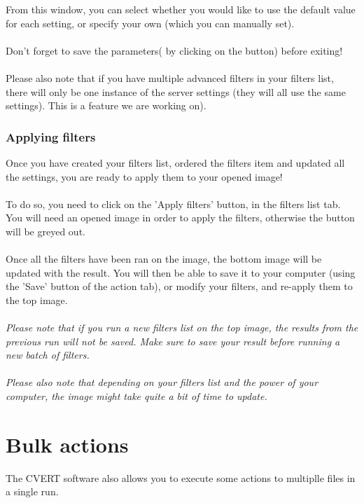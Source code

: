\documentclass[12pt,a4paper]{article}
\begin{document}
From this window, you can select whether you would like to use the default value for each setting, or specify your own (which you can manually set).\\
~\\
Don't forget to save the parameters( by clicking on the button) before exiting!\\
~\\
Please also note that if you have multiple advanced filters in your filters list, there will only be one instance of the server settings (they will all use the same settings). This is a feature we are working on).

\section{Applying filters}

Once you have created your filters list, ordered the filters item and updated all the settings, you are ready to apply them to your opened image!\\
~\\
To do so, you need to click on the 'Apply filters' button, in the filters list tab. You will need an opened image in order to apply the filters, otherwise the button will be greyed out.\\
~\\
Once all the filters have been ran on the image, the bottom image will be updated with the result. You will then be able to save it to your computer (using the 'Save' button of the action tab), or modify your filters, and re-apply them to the top image.\\
~\\
\textit{Please note that if you run a new filters list on the top image, the results from the previous run will not be saved. Make sure to save your result before running a new batch of filters.}\\
~\\
\textit{Please also note that depending on your filters list and the power of your computer, the image might take quite a bit of time to update.}

\pagebreak

\part{Bulk actions}
\setcounter{section}{0}

The CVERT software also allows you to execute some actions to multiplle files in a single run.
\end{document}
